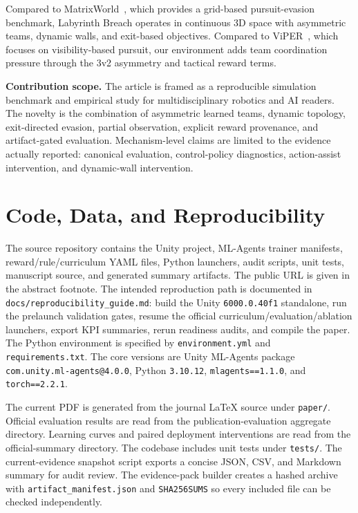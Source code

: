 \documentclass[journal]{IEEEtran}
\begin{document}
Compared to MatrixWorld~\cite{matrixworld2023}, which provides a grid-based pursuit-evasion benchmark, Labyrinth Breach operates in continuous 3D space with asymmetric teams, dynamic walls, and exit-based objectives. Compared to ViPER~\cite{viper2025}, which focuses on visibility-based pursuit, our environment adds team coordination pressure through the 3v2 asymmetry and tactical reward terms.

\textbf{Contribution scope.} The article is framed as a reproducible simulation
benchmark and empirical study for multidisciplinary robotics and AI readers.
The novelty is the combination of asymmetric learned teams, dynamic topology,
exit-directed evasion, partial observation, explicit reward provenance, and
artifact-gated evaluation. Mechanism-level claims are limited to the evidence
actually reported: canonical evaluation, control-policy diagnostics,
action-assist intervention, and dynamic-wall intervention.

\section{Code, Data, and Reproducibility}

The source repository contains the Unity project, ML-Agents trainer manifests, reward/rule/curriculum YAML files, Python launchers, audit scripts, unit tests, manuscript source, and generated summary artifacts. The public URL is given in the abstract footnote. The intended reproduction path is documented in \texttt{docs/reproducibility\_guide.md}: build the Unity \texttt{6000.0.40f1} standalone, run the prelaunch validation gates, resume the official curriculum/evaluation/ablation launchers, export KPI summaries, rerun readiness audits, and compile the paper. The Python environment is specified by \texttt{environment.yml} and \texttt{requirements.txt}. The core versions are Unity ML-Agents package \texttt{com.unity.ml-agents@4.0.0}, Python \texttt{3.10.12}, \texttt{mlagents==1.1.0}, and \texttt{torch==2.2.1}.

The current PDF is generated from the journal \LaTeX{} source under \texttt{paper/}. Official evaluation results are read from the publication-evaluation aggregate directory. Learning curves and paired deployment interventions are read from the official-summary directory. The codebase includes unit tests under \texttt{tests/}. The current-evidence snapshot script exports a concise JSON, CSV, and Markdown summary for audit review. The evidence-pack builder creates a hashed archive with \texttt{artifact\_manifest.json} and \texttt{SHA256SUMS} so every included file can be checked independently.
\end{document}
